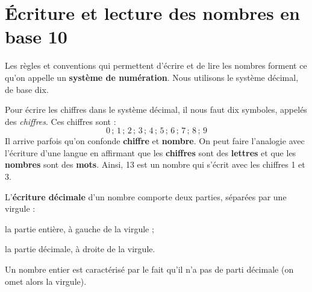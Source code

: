 \section{\'Ecriture et lecture des nombres en base 10}


Les règles et conventions qui permettent d'écrire et de lire les nombres forment ce qu'on appelle un \textbf{système de numération}. Nous utilisons le système décimal, de base dix.

\begin{aconnaitre}
Pour écrire les chiffres dans le système décimal, il nous faut dix symboles, appelés des \emph{chiffres}. Ces chiffres sont :
\[ 0\,;\,1\,;\,2\,;\,3\,;\,4\,;\,5\,;\,6\,;\,7\,;\,8\,;\,9  \]
Il arrive parfois qu'on confonde \textbf{chiffre} et \textbf{nombre}. On peut faire l'analogie avec l'écriture d'une langue en affirmant que les \textbf{chiffres} sont des \textbf{lettres} et que les \textbf{nombres} sont des \textbf{mots}. Ainsi, 13 est un nombre qui s'écrit avec les chiffres 1 et 3.
\end{aconnaitre}

\vspace{2em}

L'\textbf{écriture décimale} d'un nombre comporte deux parties, séparées par une virgule :

\hspace{2em}\textbullet\hspace{.25em} la partie entière, à gauche de la virgule ;

\hspace{2em}\textbullet\hspace{.25em} la partie décimale, à droite de la virgule.



Un nombre entier est caractérisé par le fait qu'il n'a pas de parti décimale (on omet alors la virgule).

